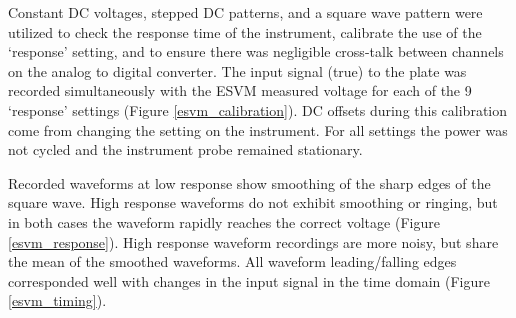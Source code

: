Constant DC voltages, stepped DC patterns, and a square wave pattern were utilized to check the response time of the instrument, calibrate the use of the `response' setting, and to ensure there was negligible cross-talk between channels on the analog to digital converter.  The input signal (true) to the plate was recorded simultaneously with the ESVM measured voltage for each of the 9 `response' settings (Figure \ref{esvm_calibration}).  DC offsets during this calibration come from changing the setting on the instrument.  For all settings the power was not cycled and the instrument probe remained stationary.  

Recorded waveforms at low response show smoothing of the sharp edges of the square wave.  High response waveforms do not exhibit smoothing or ringing, but in both cases the waveform rapidly reaches the correct voltage (Figure \ref{esvm_response}).  High response waveform recordings are more noisy, but share the mean of the smoothed waveforms.  All waveform leading/falling edges corresponded well with changes in the input signal in the time domain (Figure \ref{esvm_timing}).

\clearpage

